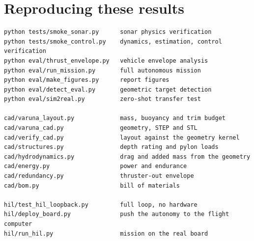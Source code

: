 \documentclass[10pt,a4paper]{article}
\begin{document}
\section*{Reproducing these results}

\begin{minipage}{\linewidth}
\begin{verbatim}
python tests/smoke_sonar.py      sonar physics verification
python tests/smoke_control.py    dynamics, estimation, control verification
python eval/thrust_envelope.py   vehicle envelope analysis
python eval/run_mission.py       full autonomous mission
python eval/make_figures.py      report figures
python eval/detect_eval.py       geometric target detection
python eval/sim2real.py          zero-shot transfer test

cad/varuna_layout.py             mass, buoyancy and trim budget
cad/varuna_cad.py                geometry, STEP and STL
cad/verify_cad.py                layout against the geometry kernel
cad/structures.py                depth rating and pylon loads
cad/hydrodynamics.py             drag and added mass from the geometry
cad/energy.py                    power and endurance
cad/redundancy.py                thruster-out envelope
cad/bom.py                       bill of materials

hil/test_hil_loopback.py         full loop, no hardware
hil/deploy_board.py              push the autonomy to the flight computer
hil/run_hil.py                   mission on the real board
\end{verbatim}
\end{minipage}
\end{document}
